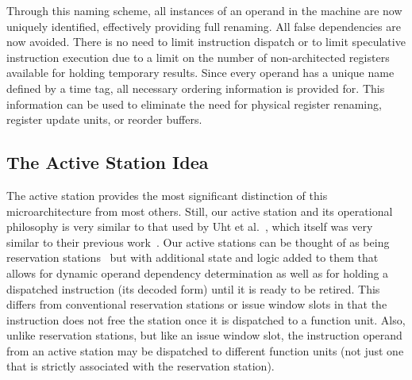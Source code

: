 \documentclass{book}
\begin{document}
Through this naming scheme, all instances of an operand
in the machine are now uniquely identified, effectively 
providing full renaming.
All false dependencies are now avoided.
There is no need to limit instruction dispatch or to limit speculative
instruction execution due to a limit on the number of non-architected
registers available for holding temporary results.
Since every operand has a unique name defined by a time tag, 
all necessary ordering information is provided for.
This information can be used 
to eliminate the need for physical register renaming,
register update units, or reorder buffers.
%
%
\subsection{The Active Station Idea}
%
The active station provides the most significant distinction of this
microarchitecture from most others.
Still, our active station and its operational philosophy
is very similar to that used by 
Uht et al.~\cite{uht03levo}, which itself was very similar to
their previous work~\cite{uht02realizing}.
Our active stations can be thought of as being 
reservation stations~\cite{Tom67} but
with additional state and logic added to them that allows
for dynamic operand dependency determination as well as
for holding a dispatched instruction (its decoded form) 
until it is ready to be
retired.  This differs from conventional reservation stations
or issue window slots in that the instruction does not free
the station once it is dispatched to a function unit.
Also, unlike reservation stations, but like an issue window slot,
the instruction operand from an active station may be dispatched
to different function units (not just one that is strictly
associated with the reservation station).
%
\end{document}
